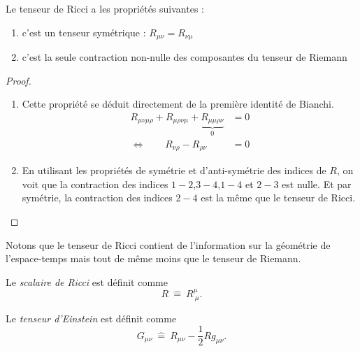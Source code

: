 \documentclass[a4paper,11pt]{report}
\begin{document}
        \begin{prop}\begin{leftbar}
            Le tenseur de Ricci a les propriétés suivantes :
            \begin{enumerate}[label = \textit{\roman*)}]
                \item c'est un tenseur symétrique : $R_{\mu\nu} = R_{\nu\mu}$
                \item c'est la seule contraction non-nulle des composantes du tenseur de Riemann
            \end{enumerate}
        \end{leftbar}\end{prop}
        
        \begin{proof}${}$
            \begin{enumerate}[label = \textit{\roman*)}]
                \item Cette propriété se déduit directement de la première identité de Bianchi.
                \begin{align}
                    R_{\mu\nu\mu\rho}+R_{\mu\rho\nu\mu}+\underbrace{R_{\mu\mu\rho\nu}}_{0} &= 0\\
                    \Leftrightarrow\qquad R_{\nu\rho} - R_{\rho\nu} &= 0
                \end{align}
                \item En utilisant les propriétés de symétrie et d'anti-symétrie des indices de $R$, on voit que la contraction des indices $1-2$,$3-4$,$1-4$ et $2-3$ est nulle. Et par symétrie, la contraction des indices $2-4$ est la même que le tenseur de Ricci.
            \end{enumerate}
        \end{proof}
        
        Notons que le tenseur de Ricci contient de l'information sur la géométrie de l'espace-temps mais tout de même moins que le tenseur de Riemann.
        
         \begin{defn}
            Le \textit{scalaire de Ricci} est définit comme
            \begin{equation}
                R ~\hat{=}~ R^\mu_{~\mu}.
            \end{equation}
        \end{defn}
        
        \begin{defn}
            Le \textit{tenseur d'Einstein} est définit comme
            \begin{equation}
                G_{\mu\nu} ~\hat{=}~ R_{\mu\nu}-\frac{1}{2}Rg_{\mu\nu}.
            \end{equation}
        \end{defn}
        
\end{document}
